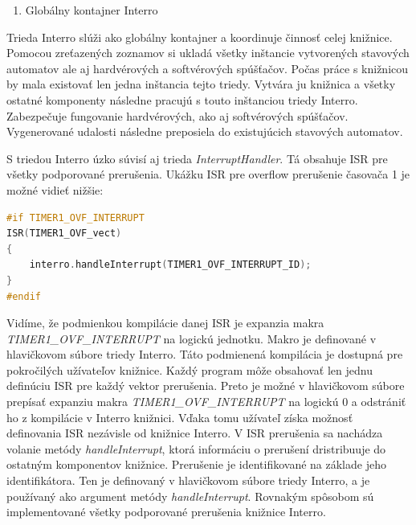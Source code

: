 \begin{enumerate}[resume]
    \item Globálny kontajner Interro
\end{enumerate}

Trieda Interro slúži ako globálny kontajner a koordinuje činnosť celej knižnice. Pomocou zreťazených zoznamov si ukladá všetky inštancie vytvorených stavových automatov
ale aj hardvérových a softvérových spúšťačov. Počas práce s knižnicou by mala existovať len jedna inštancia tejto triedy. Vytvára ju knižnica a všetky ostatné komponenty
následne pracujú s touto inštanciou triedy Interro. Zabezpečuje fungovanie hardvérových, ako aj softvérových spúšťačov. Vygenerované udalosti následne preposiela do
existujúcich stavových automatov. \par
S triedou Interro úzko súvisí aj trieda \textit{InterruptHandler}. Tá obsahuje ISR pre všetky podporované prerušenia. Ukážku ISR pre overflow prerušenie časovača 1
je možné vidieť nižšie:
\begin{lstlisting}[language=c++]  
#if TIMER1_OVF_INTERRUPT
ISR(TIMER1_OVF_vect)
{
    interro.handleInterrupt(TIMER1_OVF_INTERRUPT_ID);
}
#endif
\end{lstlisting}


Vidíme, že podmienkou kompilácie danej ISR je expanzia makra \textit{TIMER1\_OVF\_INTERRUPT} na logickú jednotku. Makro je definované v hlavičkovom súbore triedy Interro.
Táto podmienená kompilácia je dostupná pre pokročilých užívateľov knižnice. Každý program môže obsahovať len jednu definúciu ISR pre každý vektor prerušenia. Preto je
možné v hlavičkovom súbore prepísať expanziu makra \textit{TIMER1\_OVF\_INTERRUPT} na logickú 0 a odstrániť ho z kompilácie v Interro knižnici. Vďaka tomu užívateľ získa
možnosť definovania ISR nezávisle od knižnice Interro. V ISR prerušenia sa nachádza volanie metódy \textit{handleInterrupt}, ktorá informáciu o prerušení dristribuuje
do ostatným komponentov knižnice. Prerušenie je identifikované na základe jeho identifikátora. Ten je definovaný v hlavičkovom súbore triedy Interro, a je používaný
ako argument metódy \textit{handleInterrupt}.
Rovnakým spôsobom sú implementované všetky podporované prerušenia knižnice Interro.

